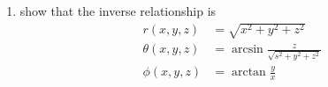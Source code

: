 \documentclass[12pt,a4paper]{report}
\newcommand{\BLUE}[1]{\textcolor{blue}{#1}}
\begin{document}
\begin{enumerate}[label=\textbf{\arabic*.}]
\BLUE{``Align in a natural way", let the two coordinate systems have the same origin and let the polar axis be $z$, $\theta$ be the angle made between the line connecting the point to the origin and $z$.  Then $z=r\cos\theta$.  Project this line into the $x-y$ plane producing the angle $\phi$ from the $x$ axis.  The length of this projection is $r\sin\theta$ and giving us $x=r\sin\theta\cos\phi$ and $y=r\sin\theta\sin\phi$
}

\item show that the inverse relationship is 
\begin{align*}
	r(x,y,z) &= \sqrt{x^2+y^2+z^2}\\
	\theta(x,y,z) &= \arcsin\frac{z}{\sqrt{s^2+y^2+z^2}} \\
	\phi(x,y,z) &= \arctan\frac{y}{x}
\end{align*}
\end{enumerate}
\end{document}
